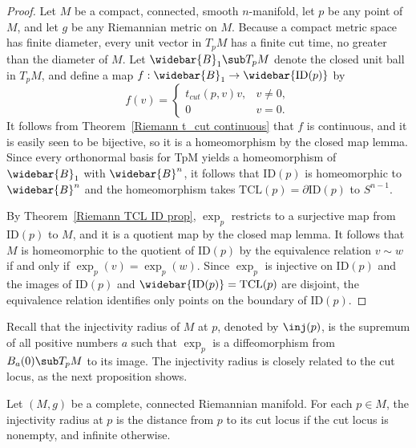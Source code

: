 \begin{proof}
Let $M$ be a compact, connected, smooth $n$-manifold, let $p$ be any point of $M$, and let $g$ be any Riemannian metric on $M$. Because a compact metric space has finite diameter, every unit vector in $T_pM$ has a finite cut time, no greater than the diameter of $M$. Let $\widebar{B}_1\sub T_pM$ denote the closed unit ball in $T_pM$, and define a map $f:\widebar{B}_1\to\widebar{\mathrm{ID}(p)}$ by
\[f(v)=\begin{cases}
t_{cut}(p,v)v,&v\neq 0,\\
0&v=0.
\end{cases}\]
It follows from Theorem~\ref{Riemann t_cut continuous} that $f$ is continuous, and it is easily seen to be bijective, so it is a homeomorphism by the closed map lemma. Since every orthonormal basis for TpM yields a homeomorphism of $\widebar{B}_1$ with $\widebar{B}^n$, it follows that $\mathrm{ID}(p)$ is homeomorphic to $\widebar{B}^n$ and the homeomorphism takes $\mathrm{TCL}(p)=\partial\mathrm{ID}(p)$ to $S^{n-1}$.\par
By Theorem~\ref{Riemann TCL ID prop}, $\exp_p$ restricts to a surjective map from $\mathrm{ID}(p)$ to $M$, and it is a quotient map by the closed map lemma. It follows that $M$ is homeomorphic to the quotient of $\mathrm{ID}(p)$ by the equivalence relation $v\sim w$ if and only if $\exp_p(v)=\exp_p(w)$. Since $\exp_p$ is injective on $\mathrm{ID}(p)$ and the images of $\mathrm{ID}(p)$ and $\widebar{\mathrm{ID}(p)}=\mathrm{TCL}(p)$ are disjoint, the equivalence relation identifies only points on the boundary of $\mathrm{ID}(p)$.
\end{proof}
Recall that the injectivity radius of $M$ at $p$, denoted by $\inj(p)$, is the supremum of all positive numbers $a$ such that $\exp_p$ is a diffeomorphism from 
$B_a(0)\sub T_pM$ to its image. The injectivity radius is closely related to the cut locus, as the next proposition shows.
\begin{proposition}
Let $(M,g)$ be a complete, connected Riemannian manifold. For each $p\in M$, the injectivity radius at $p$ is the distance from $p$ to its cut locus if the cut locus 
is nonempty, and infinite otherwise.
\end{proposition}
